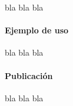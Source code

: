 bla bla bla

\paragraph*{Ejemplo de uso}

bla bla bla

\paragraph*{Publicación}

bla bla bla





 











